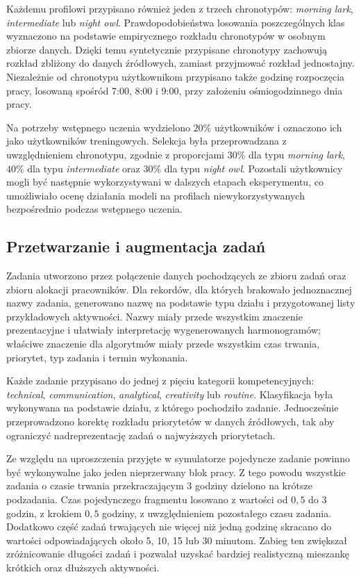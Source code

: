 Każdemu profilowi przypisano również jeden z trzech chronotypów: \textit{morning lark}, \textit{intermediate} lub \textit{night owl}. Prawdopodobieństwa losowania poszczególnych klas wyznaczono na podstawie empirycznego rozkładu chronotypów w osobnym zbiorze danych. Dzięki temu syntetycznie przypisane chronotypy zachowują rozkład zbliżony do danych źródłowych, zamiast przyjmować rozkład jednostajny. Niezależnie od chronotypu użytkownikom przypisano także godzinę rozpoczęcia pracy, losowaną spośród 7:00, 8:00 i 9:00, przy założeniu ośmiogodzinnego dnia pracy.

Na potrzeby wstępnego uczenia wydzielono $20\%$ użytkowników i oznaczono ich jako użytkowników treningowych. Selekcja była przeprowadzana z uwzględnieniem chronotypu, zgodnie z proporcjami $30\%$ dla typu \textit{morning lark}, $40\%$ dla typu \textit{intermediate} oraz $30\%$ dla typu \textit{night owl}. Pozostali użytkownicy mogli być następnie wykorzystywani w dalszych etapach eksperymentu, co umożliwiało ocenę działania modeli na profilach niewykorzystywanych bezpośrednio podczas wstępnego uczenia.

\subsection{Przetwarzanie i augmentacja zadań}

Zadania utworzono przez połączenie danych pochodzących ze zbioru zadań oraz zbioru alokacji pracowników. Dla rekordów, dla których brakowało jednoznacznej nazwy zadania, generowano nazwę na podstawie typu działu i przygotowanej listy przykładowych aktywności. Nazwy miały przede wszystkim znaczenie prezentacyjne i ułatwiały interpretację wygenerowanych harmonogramów; właściwe znaczenie dla algorytmów miały przede wszystkim czas trwania, priorytet, typ zadania i termin wykonania.

Każde zadanie przypisano do jednej z pięciu kategorii kompetencyjnych: \textit{technical}, \textit{communication}, \textit{analytical}, \textit{creativity} lub \textit{routine}. Klasyfikacja była wykonywana na podstawie działu, z którego pochodziło zadanie. Jednocześnie przeprowadzono korektę rozkładu priorytetów w danych źródłowych, tak aby ograniczyć nadreprezentację zadań o najwyższych priorytetach.

Ze względu na uproszczenia przyjęte w symulatorze pojedyncze zadanie powinno być wykonywalne jako jeden nieprzerwany blok pracy. Z tego powodu wszystkie zadania o czasie trwania przekraczającym 3 godziny dzielono na krótsze podzadania. Czas pojedynczego fragmentu losowano z wartości od $0{,}5$ do $3$ godzin, z krokiem $0{,}5$ godziny, z uwzględnieniem pozostałego czasu zadania. Dodatkowo część zadań trwających nie więcej niż jedną godzinę skracano do wartości odpowiadających około 5, 10, 15 lub 30 minutom. Zabieg ten zwiększał zróżnicowanie długości zadań i pozwalał uzyskać bardziej realistyczną mieszankę krótkich oraz dłuższych aktywności.

